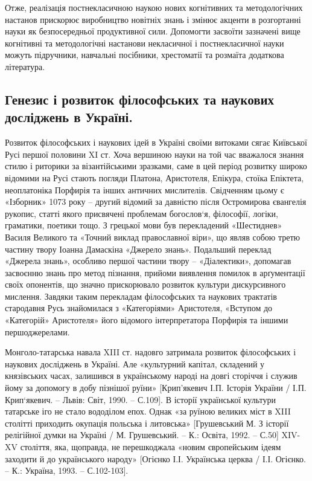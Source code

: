 Отже, реалізація постнекласичною наукою нових когнітивних та
методологічних настанов прискорює виробництво новітніх знань і змінює
акценти в розгортанні науки як безпосередньої продуктивної сили. Допомогти
засвоїти зазначені вище когнітивні та методологічні настанови некласичної і
постнекласичної науки можуть підручники, навчальні посібники, хрестоматії та
розмаїта додаткова література.

\subsection[Генезис і розвиток досліджень в Україні.]{Генезис і розвиток філософських та наукових досліджень в Україні.}
Розвиток філософських і наукових ідей в Україні своїми витоками сягає
Київської Русі першої половини XI ст. Хоча вершиною науки на той час
вважалося знання стилю і риторики за візантійськими зразками, саме в цей
період розвитку широко відомими на Русі стають погляди Платона,
Аристотеля, Епікура, стоїка Епіктета, неоплатоніка Порфирія та інших
античних мислителів. Свідченням цьому є «Ізборник» 1073 року – другий
відомий за давністю після Остромирова євангелія рукопис, статті якого
присвячені проблемам богослов`я, філософії, логіки, граматики, поетики тощо.
З грецької мови був перекладений «Шестиднев» Василя Великого та «Точний
виклад православної віри», що являв собою третю частину твору Іоанна
Дамаскіна «Джерело знань». Подальший переклад «Джерела знань», особливо
першої частини твору – «Діалектики», допомагав засвоєнню знань про метод
пізнання, прийоми виявлення помилок в арґументації своїх опонентів, що
значно прискорювало розвиток культури дискурсивного мислення. Завдяки
таким перекладам філософських та наукових трактатів стародавня Русь
знайомилася з «Категоріями» Аристотеля, «Вступом до «Категорій» Аристотеля»
його відомого інтерпретатора Порфирія та іншими першоджерелами.

Монголо-татарська навала XIII ст. надовго затримала розвиток
філософських і наукових досліджень в Україні. Але «культурний капітал,
складений у князівських часах, залишився в українському народі на довгі
сторіччя і служив йому за допомогу в добу пізнішої руїни» [Крип’якевич І.П.
Історія України / І.П. Крип`якевич. – Львів: Світ, 1990. – С.109]. В історії
української культури татарське іго не стало вододілом епох. Однак «за руїною
великих міст в XIII столітті приходить окупація польська і литовська»
[Грушевський М. З історії релігійної думки на Україні / М. Грушевський. – К.:
Освіта, 1992. – С.50] XIV-XV століття, яка, щоправда, не перешкоджала
«новим європейським ідеям заходити й до українського народу» [Огієнко І.І.
Українська церква / І.І. Огієнко. – К.: Україна, 1993. – С.102-103].

